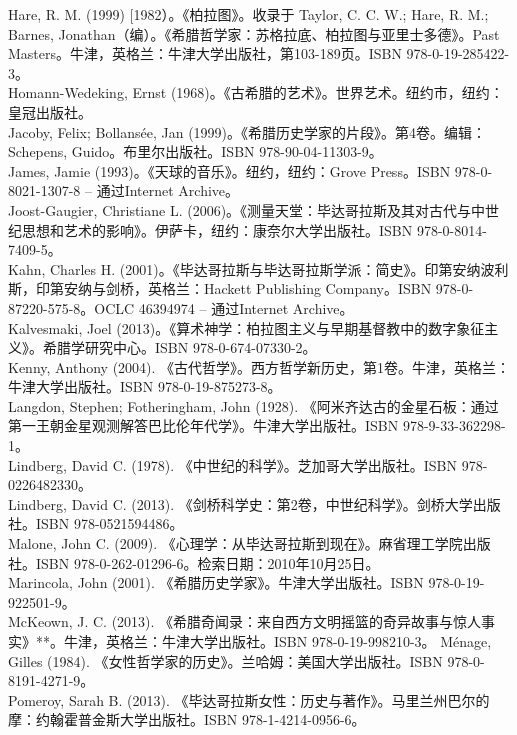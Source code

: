 Hare, R. M. (1999) [1982）。《柏拉图》。收录于 Taylor, C. C. W.; Hare, R. M.; Barnes, Jonathan（编）。《希腊哲学家：苏格拉底、柏拉图与亚里士多德》。Past Masters。牛津，英格兰：牛津大学出版社，第103-189页。ISBN 978-0-19-285422-3。\\  
Homann-Wedeking, Ernst (1968)。《古希腊的艺术》。世界艺术。纽约市，纽约：皇冠出版社。\\  
Jacoby, Felix; Bollansée, Jan (1999)。《希腊历史学家的片段》。第4卷。编辑：Schepens, Guido。布里尔出版社。ISBN 978-90-04-11303-9。\\  
James, Jamie (1993)。《天球的音乐》。纽约，纽约：Grove Press。ISBN 978-0-8021-1307-8 – 通过Internet Archive。\\  
Joost-Gaugier, Christiane L. (2006)。《测量天堂：毕达哥拉斯及其对古代与中世纪思想和艺术的影响》。伊萨卡，纽约：康奈尔大学出版社。ISBN 978-0-8014-7409-5。\\  
Kahn, Charles H. (2001)。《毕达哥拉斯与毕达哥拉斯学派：简史》。印第安纳波利斯，印第安纳与剑桥，英格兰：Hackett Publishing Company。ISBN 978-0-87220-575-8。OCLC 46394974 – 通过Internet Archive。\\  
Kalvesmaki, Joel (2013)。《算术神学：柏拉图主义与早期基督教中的数字象征主义》。希腊学研究中心。ISBN 978-0-674-07330-2。\\
Kenny, Anthony (2004). 《古代哲学》。西方哲学新历史，第1卷。牛津，英格兰：牛津大学出版社。ISBN 978-0-19-875273-8。\\  
Langdon, Stephen; Fotheringham, John (1928). 《阿米齐达古的金星石板：通过第一王朝金星观测解答巴比伦年代学》。牛津大学出版社。ISBN 978-9-33-362298-1。\\  
Lindberg, David C. (1978). 《中世纪的科学》。芝加哥大学出版社。ISBN 978-0226482330。\\  
Lindberg, David C. (2013). 《剑桥科学史：第2卷，中世纪科学》。剑桥大学出版社。ISBN 978-0521594486。\\  
Malone, John C. (2009). 《心理学：从毕达哥拉斯到现在》。麻省理工学院出版社。ISBN 978-0-262-01296-6。检索日期：2010年10月25日。\\  
Marincola, John (2001). 《希腊历史学家》。牛津大学出版社。ISBN 978-0-19-922501-9。\\  
McKeown, J. C. (2013). 《希腊奇闻录：来自西方文明摇篮的奇异故事与惊人事实》**。牛津，英格兰：牛津大学出版社。ISBN 978-0-19-998210-3。  
Ménage, Gilles (1984). 《女性哲学家的历史》。兰哈姆：美国大学出版社。ISBN 978-0-8191-4271-9。\\  
Pomeroy, Sarah B. (2013). 《毕达哥拉斯女性：历史与著作》。马里兰州巴尔的摩：约翰霍普金斯大学出版社。ISBN 978-1-4214-0956-6。\\




































